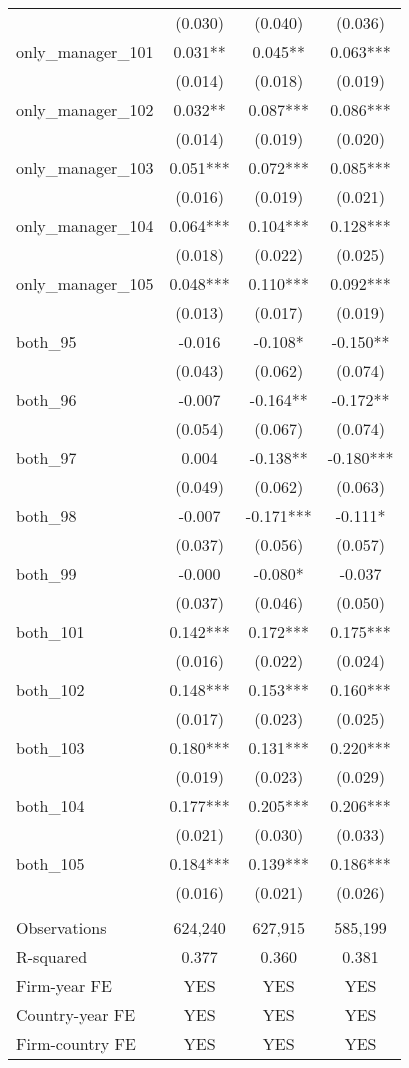 \begin{tabular}{lccc}
 & (0.030) & (0.040) & (0.036) \\
only\_manager\_101 & 0.031** & 0.045** & 0.063*** \\
 & (0.014) & (0.018) & (0.019) \\
only\_manager\_102 & 0.032** & 0.087*** & 0.086*** \\
 & (0.014) & (0.019) & (0.020) \\
only\_manager\_103 & 0.051*** & 0.072*** & 0.085*** \\
 & (0.016) & (0.019) & (0.021) \\
only\_manager\_104 & 0.064*** & 0.104*** & 0.128*** \\
 & (0.018) & (0.022) & (0.025) \\
only\_manager\_105 & 0.048*** & 0.110*** & 0.092*** \\
 & (0.013) & (0.017) & (0.019) \\
both\_95 & -0.016 & -0.108* & -0.150** \\
 & (0.043) & (0.062) & (0.074) \\
both\_96 & -0.007 & -0.164** & -0.172** \\
 & (0.054) & (0.067) & (0.074) \\
both\_97 & 0.004 & -0.138** & -0.180*** \\
 & (0.049) & (0.062) & (0.063) \\
both\_98 & -0.007 & -0.171*** & -0.111* \\
 & (0.037) & (0.056) & (0.057) \\
both\_99 & -0.000 & -0.080* & -0.037 \\
 & (0.037) & (0.046) & (0.050) \\
both\_101 & 0.142*** & 0.172*** & 0.175*** \\
 & (0.016) & (0.022) & (0.024) \\
both\_102 & 0.148*** & 0.153*** & 0.160*** \\
 & (0.017) & (0.023) & (0.025) \\
both\_103 & 0.180*** & 0.131*** & 0.220*** \\
 & (0.019) & (0.023) & (0.029) \\
both\_104 & 0.177*** & 0.205*** & 0.206*** \\
 & (0.021) & (0.030) & (0.033) \\
both\_105 & 0.184*** & 0.139*** & 0.186*** \\
 & (0.016) & (0.021) & (0.026) \\
 &  &  &  \\
Observations & 624,240 & 627,915 & 585,199 \\
R-squared & 0.377 & 0.360 & 0.381 \\
Firm-year FE & YES & YES & YES \\
Country-year FE & YES & YES & YES \\
 Firm-country FE & YES & YES & YES \\ \hline
\end{tabular}

